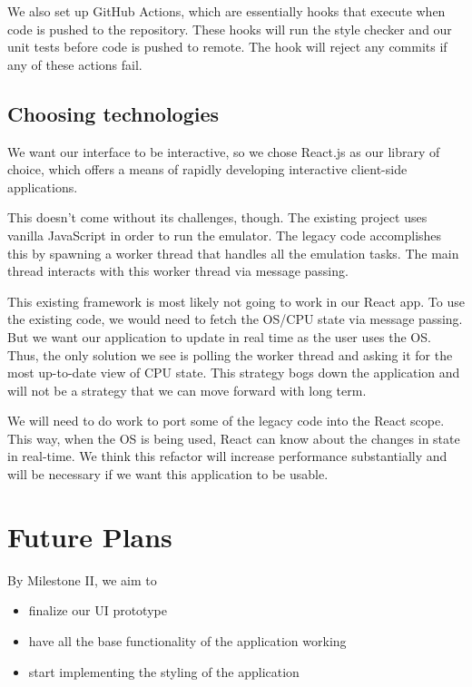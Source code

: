 We also set up GitHub Actions, which are essentially hooks that execute when
code is pushed to the repository.
These hooks will run the style checker and our unit tests before code is pushed to remote.
The hook will reject any commits if any of these actions fail.

\subsection*{Choosing technologies}

We want our interface to be interactive, so we chose React.js as our library of choice,
which offers a means of rapidly developing interactive client-side applications.

This doesn't come without its challenges, though. The existing project uses vanilla JavaScript
in order to run the emulator. The legacy code accomplishes this by spawning a worker thread
that handles all the emulation tasks. The main thread interacts with this worker thread via
message passing.

This existing framework is most likely not going to work in our React app.
To use the existing code, we would
need to fetch the OS/CPU state via message passing. But we want our application to update in real
time as the user uses the OS. Thus, the only solution we see is polling the worker thread and
asking it for the most up-to-date view of CPU state. This strategy bogs down the application
and will not be a strategy that we can move forward with long term.

We will need to do work to port some of the legacy code into the React scope. This way, when
the OS is being used, React can know about the changes in state in real-time.
We think this refactor will increase performance substantially and will be necessary
if we want this application to be usable.


\section*{Future Plans}

By Milestone II, we aim to

\begin{itemize}
  \item finalize our UI prototype
  \item have all the base functionality of the application working
  \item start implementing the styling of the application
\end{itemize}

